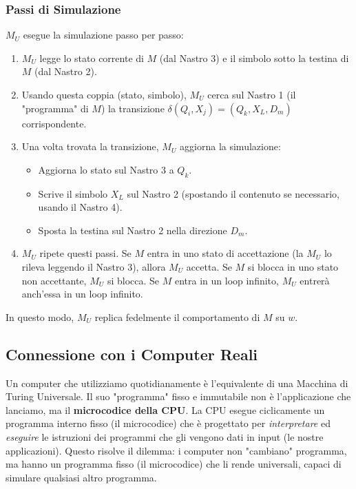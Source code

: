 \documentclass[a4paper]{article}
\begin{document}
\subsubsection{Passi di Simulazione}
$M_U$ esegue la simulazione passo per passo:
\begin{enumerate}
    \item $M_U$ legge lo stato corrente di $M$ (dal Nastro 3) e il simbolo sotto la testina di $M$ (dal Nastro 2).
    \item Usando questa coppia (stato, simbolo), $M_U$ cerca sul Nastro 1 (il "programma" di $M$) la transizione $\delta(Q_i, X_j) = (Q_k, X_L, D_m)$ corrispondente.
    \item Una volta trovata la transizione, $M_U$ aggiorna la simulazione:
    \begin{itemize}
        \item Aggiorna lo stato sul Nastro 3 a $Q_k$.
        \item Scrive il simbolo $X_L$ sul Nastro 2 (spostando il contenuto se necessario, usando il Nastro 4).
        \item Sposta la testina sul Nastro 2 nella direzione $D_m$.
    \end{itemize}
    \item $M_U$ ripete questi passi. Se $M$ entra in uno stato di accettazione (la $M_U$ lo rileva leggendo il Nastro 3), allora $M_U$ accetta. Se $M$ si blocca in uno stato non accettante, $M_U$ si blocca. Se $M$ entra in un loop infinito, $M_U$ entrerà anch'essa in un loop infinito.
\end{enumerate}
In questo modo, $M_U$ replica fedelmente il comportamento di $M$ su $w$.

\subsection{Connessione con i Computer Reali}

Un computer che utilizziamo quotidianamente è l'equivalente di una Macchina di Turing Universale. Il suo "programma" fisso e immutabile non è l'applicazione che lanciamo, ma il \textbf{microcodice della CPU}. La CPU esegue ciclicamente un programma interno fisso (il microcodice) che è progettato per \textit{interpretare} ed \textit{eseguire} le istruzioni dei programmi che gli vengono dati in input (le nostre applicazioni). Questo risolve il dilemma: i computer non "cambiano" programma, ma hanno un programma fisso (il microcodice) che li rende universali, capaci di simulare qualsiasi altro programma.
\end{document}
